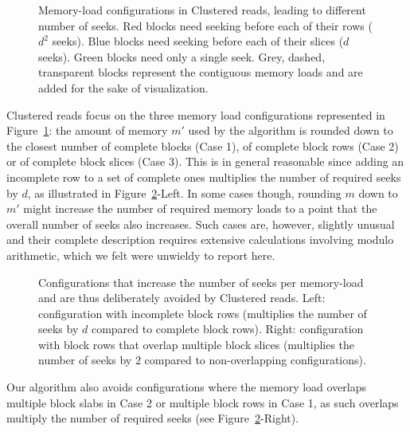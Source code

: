 \documentclass[10pt, conference, compsocconf]{IEEEtran}
\begin{document}
\begin{figure}
\centering
\def\svgwidth{0.3\columnwidth}

\def\svgwidth{0.3\columnwidth}

\def\svgwidth{0.3\columnwidth}

\caption{Memory-load configurations in Clustered reads, leading to
  different number of seeks. Red blocks need seeking before each of
  their rows ($d^2$ seeks). Blue blocks need seeking before each of
  their slices ($d$ seeks). Green blocks need only a single
  seek. Grey, dashed, transparent blocks represent the contiguous
  memory loads and are added for the sake of visualization.}
\label{fig:cluster-reads}
\end{figure}
Clustered reads focus on the three memory load
configurations represented in Figure~\ref{fig:cluster-reads}:
the amount of memory $m'$ used by the algorithm is rounded down to the
closest number of complete blocks (Case 1), of complete block rows (Case
2) or of complete block slices (Case 3). This is in general reasonable
since adding an incomplete row to a set of complete ones multiplies
the number of required seeks by $d$, as illustrated in
Figure~\ref{fig:avoided-configurations}-Left. In some cases though,
rounding $m$ down to $m'$ might increase the number of required
memory loads to a point that the overall number of seeks also
increases. Such cases are, however, slightly unusual and their
complete description requires extensive calculations involving modulo
arithmetic, which we felt were unwieldy to report here.
\begin{figure}
  \centering
\def\svgwidth{0.3\columnwidth}

\quad \quad \quad
\def\svgwidth{0.3\columnwidth}

\caption{Configurations that increase the number of seeks per
  memory-load and are thus deliberately avoided by Clustered
  reads. Left: configuration with incomplete block rows (multiplies
  the number of seeks by $d$ compared to complete block rows). Right:
  configuration with block rows that overlap multiple block slices
  (multiplies the number of seeks by $2$ compared to non-overlapping
  configurations).}
\label{fig:avoided-configurations}
\end{figure}

Our algorithm also avoids configurations where the memory load
overlaps multiple block slabs in Case 2 or multiple block rows in
Case 1, as such overlaps multiply the number of required seeks (see
Figure~\ref{fig:avoided-configurations}-Right).
\end{document}
